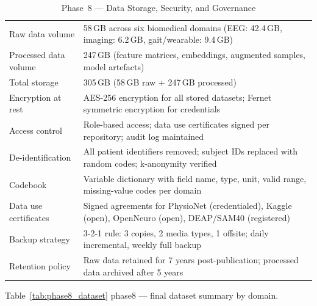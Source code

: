 \begin{xltabular}{\textwidth}{@{} p{3.2cm} X @{}}
\caption{Phase~8 --- Data Storage, Security, and Governance}
\label{tab:phase8_storage}\\
\toprule
{} &  \\
\midrule
\endfirsthead
\endhead
\bottomrule
\endlastfoot
Raw data volume           & 58\,GB across six biomedical domains (EEG: 42.4\,GB, imaging: 6.2\,GB, gait/wearable: 9.4\,GB) \\
\addlinespace
Processed data volume     & 247\,GB (feature matrices, embeddings, augmented samples, model artefacts) \\
\addlinespace
Total storage             & 305\,GB (58\,GB raw + 247\,GB processed) \\
\addlinespace
Encryption at rest        & AES-256 encryption for all stored datasets; Fernet symmetric encryption for credentials \\
\addlinespace
Access control            & Role-based access; data use certificates signed per repository; audit log maintained \\
\addlinespace
De-identification         & All patient identifiers removed; subject IDs replaced with random codes; k-anonymity verified \\
\addlinespace
Codebook                  & Variable dictionary with field name, type, unit, valid range, missing-value codes per domain \\
\addlinespace
Data use certificates     & Signed agreements for PhysioNet (credentialed), Kaggle (open), OpenNeuro (open), DEAP/SAM40 (registered) \\
\addlinespace
Backup strategy           & 3-2-1 rule: 3 copies, 2 media types, 1 offsite; daily incremental, weekly full backup \\
\addlinespace
Retention policy          & Raw data retained for 7 years post-publication; processed data archived after 5 years \\
\end{xltabular}
\endgroup

\vspace{1.5em}

\begingroup\singlespacing\tablefontsize\tablestripes
\noindent Table~\ref{tab:phase8_dataset} phase8 --- final dataset summary by domain.

